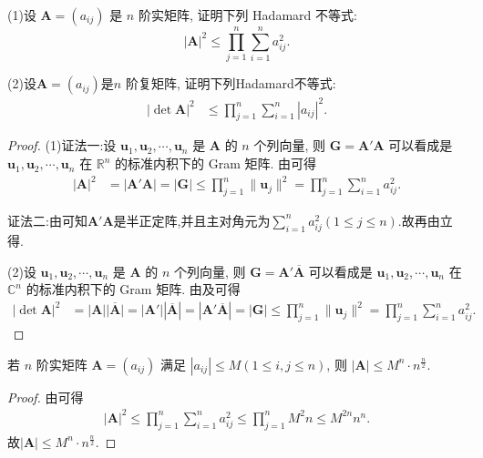 \documentclass[../../main.tex]{subfiles}%
\begin{document}
\begin{proposition}\label{proposition:矩阵的Hadamard不等式-例9.17}
(1)设 $\boldsymbol{A} = (a_{ij})$ 是 $n$ 阶实矩阵, 证明下列 Hadamard 不等式:
\[
|\boldsymbol{A}|^2 \leqslant  \prod_{j = 1}^{n} \sum_{i = 1}^{n} a_{ij}^2.
\]

(2)设$\boldsymbol{A} = (a_{ij})$是$n$ 阶复矩阵, 证明下列Hadamard不等式:
\begin{align*}
|\det \boldsymbol{A}|^2 &\leqslant  \prod_{j = 1}^{n} \sum_{i = 1}^{n} |a_{ij}|^2.
\end{align*} 
\end{proposition}
\begin{proof}
(1){\color{blue}证法一:}设 $\boldsymbol{u}_1,\boldsymbol{u}_2,\cdots,\boldsymbol{u}_n$ 是 $\boldsymbol{A}$ 的 $n$ 个列向量, 则 $\boldsymbol{G} = \boldsymbol{A}'\boldsymbol{A}$ 可以看成是 $\boldsymbol{u}_1,\boldsymbol{u}_2,\cdots,\boldsymbol{u}_n$ 在 $\mathbb{R}^n$ 的标准内积下的 Gram 矩阵. 由可得
\begin{align*}
|\boldsymbol{A}|^2 &= |\boldsymbol{A}'\boldsymbol{A}| = |\boldsymbol{G}| \leqslant  \prod_{j = 1}^{n} \|\boldsymbol{u}_j\|^2 = \prod_{j = 1}^{n} \sum_{i = 1}^{n} a_{ij}^2.
\end{align*} 

{\color{blue}证法二:}由可知$\boldsymbol{A}'\boldsymbol{A}$是半正定阵,并且主对角元为$\sum_{i = 1}^{n} a_{ij}^2(1\leqslant  j\leqslant  n)$.故再由立得.


(2)设 $\boldsymbol{u}_1,\boldsymbol{u}_2,\cdots,\boldsymbol{u}_n$ 是 $\boldsymbol{A}$ 的 $n$ 个列向量, 则 $\boldsymbol{G} = \boldsymbol{A}'\overline{\boldsymbol{A}}$ 可以看成是 $\boldsymbol{u}_1,\boldsymbol{u}_2,\cdots,\boldsymbol{u}_n$ 在 $\mathbb{C}^n$ 的标准内积下的 Gram 矩阵. 由及可得
\begin{align*}
|\det \boldsymbol{A}|^2 &= \left| \boldsymbol{A} \right|\overline{\left| \boldsymbol{A} \right|}=\left| \boldsymbol{A}' \right|\left| \overline{\boldsymbol{A}} \right|= |\boldsymbol{A}'\overline{\boldsymbol{A}}| = |\boldsymbol{G}| \leqslant  \prod_{j = 1}^{n} \|\boldsymbol{u}_j\|^2 = \prod_{j = 1}^{n} \sum_{i = 1}^{n} a_{ij}^2.
\end{align*} 
\end{proof}

\begin{corollary}\label{corollary:矩阵的Hadamard不等式的推论}
若 $n$ 阶实矩阵 $\boldsymbol{A} = (a_{ij})$ 满足 $|a_{ij}| \leqslant  M (1 \leqslant  i, j \leqslant  n)$, 则 $|\boldsymbol{A}| \leqslant  M^n \cdot n^{\frac{n}{2}}$. 
\end{corollary}
\begin{proof}
由可得
\begin{align*}
|\boldsymbol{A}|^2\leqslant   \prod_{j = 1}^{n} \sum_{i = 1}^{n} a_{ij}^2 \leqslant  \prod_{j = 1}^{n}M^2n \leqslant   M^{2n}n^n.
\end{align*}
故$|\boldsymbol{A}| \leqslant  M^n \cdot n^{\frac{n}{2}}$. 
\end{proof}
\end{document}
